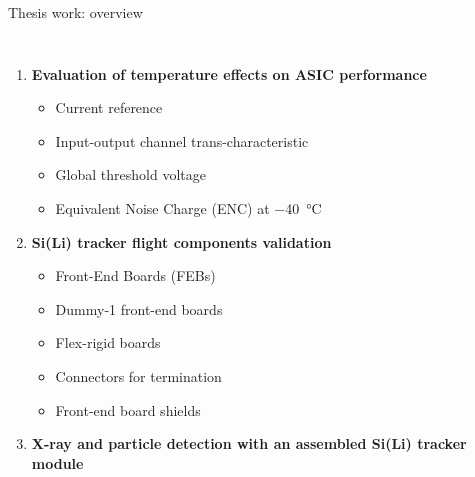 \documentclass[aspectratio=169,xcolor=dvipsnames,handout]{beamer} %
\begin{document}

\begin{frame}{Thesis work: overview}
    \addtolength{\leftmargini}{\labelsep}
    \begin{columns}
        \fontsize{11pt}{1}\selectfont
        \pause
        \begin{enumerate}
            \setlength\itemsep{1em}
            \fontsize{10pt}{1}\selectfont
            \item \textbf{Evaluation of temperature effects on ASIC performance}
            \begin{itemize}
                \fontsize{8.5pt}{1}\selectfont
                \setlength\itemsep{0.3em}
                \item Current reference
                \item Input-output channel trans-characteristic
                \item Global threshold voltage
                \item Equivalent Noise Charge (ENC) at \SI{-40}{\celsius}
            \end{itemize}\pause
            \fontsize{10pt}{1}\selectfont
            \item \textbf{Si(Li) tracker flight components validation}
            \begin{itemize}
                \fontsize{8.5pt}{1}\selectfont
                \setlength\itemsep{0.3em}
                \item Front-End Boards (FEBs)
                \item Dummy-1 front-end boards
                \item Flex-rigid boards
                \item Connectors for termination
                \item Front-end board shields
            \end{itemize}\pause
            \fontsize{10pt}{1}\selectfont
            \item \textbf{X-ray and particle detection with an assembled Si(Li) tracker module}
            \begin{itemize}
                \fontsize{8.5pt}{1}\selectfont
                \setlength\itemsep{0.3em}

\end{itemize}
\end{enumerate}
\end{columns}
\end{frame}
\end{document}
